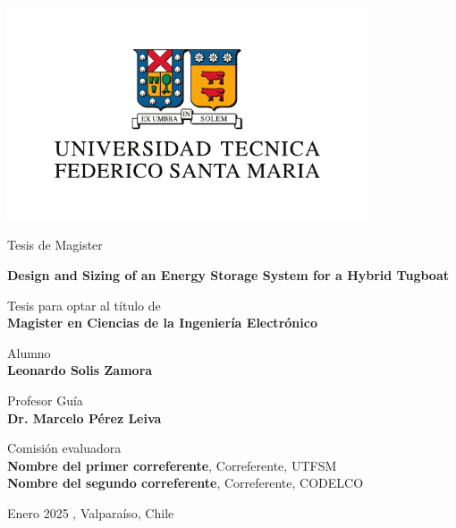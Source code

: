 \begin{titlepage}
    \begin{center}
        \vspace*{0pt}
        \includegraphics[width=0.8\textwidth]{images/logoUSM.pdf}
        
        \Large
        Tesis de Magister\\
        \huge
        \vspace{0.5cm}
        
        \textbf{Design and Sizing of an Energy Storage System for a Hybrid Tugboat}\\
        \vspace{1.5cm}
        
        \normalsize
        Tesis para optar al título de\\
        \textbf{Magister en Ciencias de la Ingeniería Electrónico}
        
        \vfill
            
        Alumno\\
        \textbf{Leonardo Solis Zamora}
        \vspace{0.8cm}
            
        Profesor Guía\\
        \textbf{Dr. Marcelo Pérez Leiva}
        \vspace{0.8cm}
        
        Comisión evaluadora\\
        \textbf{Nombre del primer correferente}, Correferente, UTFSM\\
        \textbf{Nombre del segundo correferente}, Correferente, CODELCO
        \vspace{1cm}
        
        Enero 2025		, Valparaíso, Chile
    \end{center}
\end{titlepage}